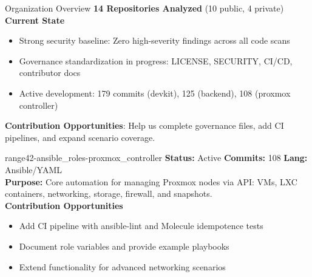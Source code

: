 \documentclass[aspectratio=169]{beamer}
\begin{document}
\begin{frame}[squeeze]{Organization Overview \; \faClipboardCheck}
  \textbf{14 Repositories Analyzed} (10 public, 4 private)\\[2mm]
  
  \textbf{Current State}
  \begin{itemize}
    \item \alert{Strong security baseline}: Zero high-severity findings across all code scans
    \item \alert{Governance standardization in progress}: LICENSE, SECURITY, CI/CD, contributor docs
    \item \alert{Active development}: 179 commits (devkit), 125 (backend), 108 (proxmox controller)
  \end{itemize}
  \vspace{1mm}
  \begin{tcolorbox}
    \faUsers\; \textbf{Contribution Opportunities}: Help us complete governance files, add CI pipelines, and expand scenario coverage.
  \end{tcolorbox}
\end{frame}

\begin{frame}[squeeze]{range42-ansible\_roles-proxmox\_controller \; \faCogs}
  \textbf{Status:} Active \hfill \textbf{Commits:} 108 \hfill \textbf{Lang:} Ansible/YAML\\[2mm]
  \textbf{Purpose:} Core automation for managing Proxmox nodes via API: VMs, LXC containers, networking, storage, firewall, and snapshots.\\[2mm]
  \textbf{Contribution Opportunities}
  \begin{itemize}
    \item Add CI pipeline with ansible-lint and Molecule idempotence tests
    \item Document role variables and provide example playbooks
    \item Extend functionality for advanced networking scenarios
  \end{itemize}
\end{frame}
\end{document}
